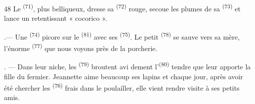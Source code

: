 \begin{VUpage}[50]{48}
\VUblancAlinea
Le \textsuperscript{(71)}, plus belliqueux, dresse sa \textsuperscript{(72)}\nl
rouge, secoue les plumes de sa \textsuperscript{(73)} et lance un\nl
retentissant « cocorico ».

.--- Une \textsuperscript{(74)} picore sur le \textsuperscript{(81)}\nl
avec ses \textsuperscript{(75)}. Le petit \textsuperscript{(78)}\nl
se sauve vers sa mère, l'énorme \textsuperscript{(77)} que nous\nl
voyons près de la porcherie.

. --- Dans leur niche, les \textsuperscript{(79)} broutent avi\cc
dement l'\textsuperscript{(80)} tendre que leur apporte la fille du\nl
fermier. Jeannette aime beaucoup ses lapins et chaque\nl
jour, après avoir été chercher les \textsuperscript{(76)} frais dans\nl
le poulailler, elle vient rendre visite à ses petits amis.

\VUsaut{6.0mm}
\VUfilet{22mm}
\end{VUpage}
